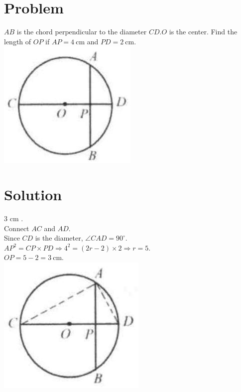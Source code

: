 \documentclass{article}
\begin{document}
\section*{Problem}
\(A B\) is the chord perpendicular to the diameter \(C D . O\) is the center. Find the length of \(O P\) if \(A P=4 \mathrm{~cm}\) and \(P D=2 \mathrm{~cm}\).\\
\centering
\includegraphics[width=\textwidth]{images/170(3).jpg}

\section*{Solution}
3 cm .\\
Connect \(A C\) and \(A D\).\\
Since \(C D\) is the diameter, \(\angle C A D=90^{\circ}\).\\
\(A P^{2}=C P \times P D \Rightarrow 4^{2}=(2 r-2) \times 2 \Rightarrow r=5\).\\
\(O P=5-2=3 \mathrm{~cm}\).\\
\centering
\includegraphics[width=\textwidth]{images/173(3).jpg}
\end{document}

